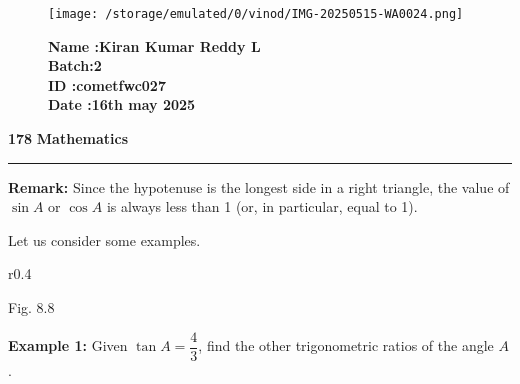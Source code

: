 \documentclass[12pt]{article}
\begin{document}
\begin{figure}[h!]
    \begin{minipage}{0.45\textwidth}  %
            \texttt{[image: /storage/emulated/0/vinod/IMG-20250515-WA0024.png]}  %
	        \end{minipage} \hfill
		    \begin{minipage}{0.45\textwidth}  %
		            \textbf{Name :Kiran Kumar Reddy L} \\
			            \textbf{Batch:2} \\
				            \textbf{ID   :cometfwc027} \\
					            \textbf{Date :16th may 2025} 
						        \end{minipage}
							\end{figure}

\noindent
\textcolor{headerblue}{\textbf{178}} \hfill 
\vspace{-9pt}
\textcolor{headerblue}{\textbf{Mathematics}} \\
\textcolor{headerblue}{\rule{\textwidth}{2pt}}

\vspace{0.8em}
\noindent
\textbf{\textcolor{headerblue}{Remark:}} Since the hypotenuse is the longest side in a right triangle, the value of $\sin A$ or $\cos A$ is always less than 1 (or, in particular, equal to 1).

\vspace{0.8em}
\noindent
Let us consider some examples.

\begin{wrapfigure}{r}{0.4\textwidth}
\vspace{-3.5em}
\centering
{}

\textcolor{headerblue}{Fig. 8.8}
\end{wrapfigure}

\vspace{1em}
\noindent
\textbf{\textcolor{headerblue}{Example 1:}} Given $ \tan A = \dfrac{4}{3}$, find the other trigonometric ratios of the angle $A$.
\end{document}
